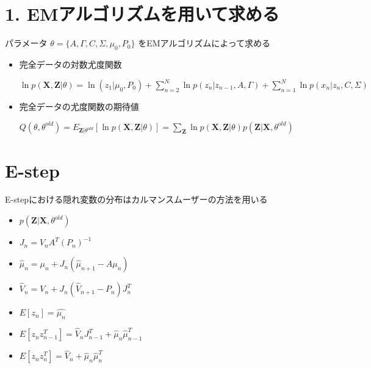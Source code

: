 \documentclass[letterpaper,10pt,dvipdfmx]{sphinxmanual}
\begin{document}
\section{1. EMアルゴリズムを用いて求める}
\label{docs/estimate_parameter:em}
パラメータ \(\theta = \lbrace A , \Gamma , C , \Sigma , \mu_{0} , P_{0} \rbrace\) をEMアルゴリズムによって求める
\begin{itemize}
\item {} 
完全データの対数尤度関数

\(\ln p(\mathbf{X},\mathbf{Z}|\theta) = \ln(z_{1}|\mu_{0},P_{0}) + \sum_{n=2}^N \ln p(z_{n}|z_{n-1},A,\Gamma) + \sum_{n=1}^{N} \ln p(x_{n}|z_{n},C,\Sigma)\)

\item {} 
完全データの尤度関数の期待値

\(Q(\theta,\theta^{old})=E_{\mathbf{Z}|\theta^{old}}[\ln p(\mathbf{X},\mathbf{Z}|\theta)] = \sum_{\mathbf{Z}} \ln p(\mathbf{X},\mathbf{Z}|\theta) p(\mathbf{Z}|\mathbf{X},\theta^{old})\)

\end{itemize}


\section{E-step}
\label{docs/estimate_parameter:e-step}
E-stepにおける隠れ変数の分布はカルマンスムーザーの方法を用いる
\begin{itemize}
\item {} 
\(p(\mathbf{Z}|\mathbf{X},\theta^{old})\)

\item {} 
\(J_{n} = V_{n} A^{T} (P_{n})^{-1}\)

\item {} 
\(\hat{\mu}_{n} = \mu_{n} + J_{n}(\hat{\mu}_{n+1} - A \mu_{n})\)

\item {} 
\(\hat{V}_{n} = V_{n} + J_{n}(\hat{V}_{n+1} -P_{n})J_{n}^{T}\)

\item {} 
\(E[z_{n}] = \hat{\mu_{n}}\)

\item {} 
\(E[z_{n} z_{n-1}^{T}] = \hat{V}_{n} J_{n-1}^{T} + \hat{\mu}_{n} \hat{\mu}_{n-1}^{T}\)

\item {} 
\(E[z_{n} z_{n}^{T}] = \hat{V}_{n} + \hat{\mu}_{n} \hat{\mu}_{n}^{T}\)

\end{itemize}
\end{document}
